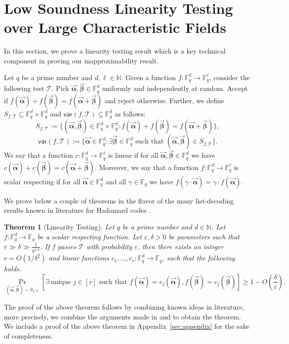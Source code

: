 \documentclass[10pt,a4paper]{article}
\newcommand{\F}{\mathbb{F}}
\renewcommand{\ge}{ \geqslant}
\newtheorem{theorem}{Theorem}[section]
\renewcommand{\epsilon}{\varepsilon}
\newcommand{\alphab}{\vec{\bm{\alpha}}}
\newcommand{\betab}{\vec{\bm{\beta}}}
\newcommand{\var}{\mathsf{var}}
\begin{document}
\section{Low Soundness Linearity Testing over Large Characteristic Fields}\label{sec:lintest}

In this section, we prove a linearity testing result which is a key  technical component in proving our inapproximability result. 

Let $q$ be a prime number and $d,\ell\in\mathbb{N}$.
Given a function $f:\F_q^d\to\F_q^{\ell}$, consider the following test $\mathcal{T}$. 
Pick $\alphab,\betab\in \F_q^d$ uniformly and independently at random. Accept if $f(\alphab)+f(\betab)=f(\alphab+\betab)$ and reject otherwise. Further, we define $S_{f,\mathcal{T}}\subseteq \F_q^d\times \F_q^d$ and $\var(f,\mathcal{T})\subseteq \F_q^d$ as follows:
$$
S_{f,\mathcal{T}}:=\{(\alphab,\betab)\in\F_q^d\times \F_q^d: f(\alphab)+f(\betab)=f(\alphab+\betab) \},
$$
$$
\var(f,\mathcal{T}):=\{\alphab\in\F_q^d: \exists \betab \in \F_q^d \text{ such that }(\alphab,\betab)\in S_{f,\mathcal{T}} \}.
$$
We say that a function $c:\F_q^d\to\F_q^{\ell}$ is linear if for all $\alphab,\betab\in \F_q^d$ we have $c(\alphab)+c(\betab)=c(\alphab+\betab)$. 
Moreover, we say that a function $f:\F_q^d\to\F_q^{\ell}$ is scalar respecting if for all $\alphab\in \F_q^d$ and all $\gamma\in\F_q$ we have $f(\gamma\cdot \alphab)=\gamma\cdot f(\alphab)$.

We prove below a couple of theorems in the flavor of the many list-decoding  results known in literature for Hadamard codes \cite{GL89,GRS00,G09}. 
 
\begin{theorem}[Linearity Testing]\label{thm:lintest}
Let $q$ be a prime number and $d\in \mathbb{N}$.
Let $f:\F_q^d\to\F_q$ be a scalar respecting function. Let $\epsilon, \delta > 0$ be parameters such that 
$\epsilon \gg \delta \gg \frac{1}{q^{1/3}}$. 
If $f$  passes $\mathcal{T}$ with probability $\varepsilon$, then  there exists an integer $r = O(1/\delta^2)$ and 
\emph{linear} functions $c_1,\ldots ,c_r:\F_q^d\to\F_q$, such that the following holds.
$$
\underset{ (\alphab, \betab) \sim S_{f,\mathcal{T}} }{\Pr}\left[\exists\ \text{unique } j\in[r] \text{ such that }f(\alphab)=c_j(\alphab),
 f(\betab)=c_j(\betab) \right]\ge 1- O\left(\frac{\delta}{\epsilon}\right).
$$
\end{theorem} 


The proof of the above theorem follows by combining known ideas in literature, more precisely, we combine the arguments made in \cite{AS03} and \cite{KS13} to obtain the theorem. We include a proof of the above theorem in Appendix~\ref{sec:appendix} for the sake of completeness. 
\end{document}
